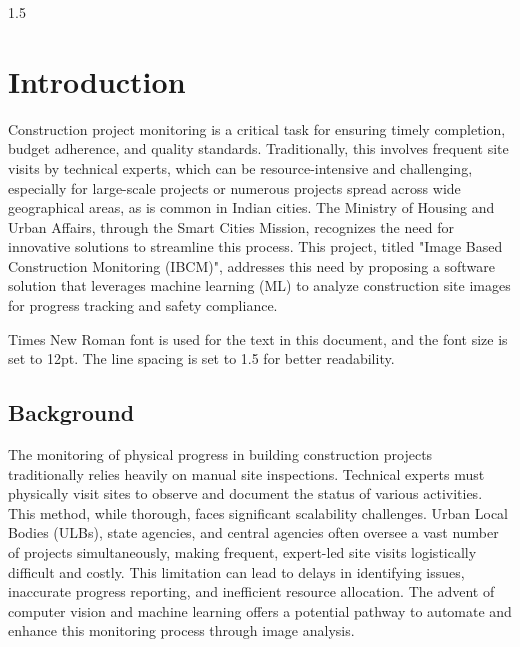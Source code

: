 \documentclass[12pt,a4paper]{report}
\begin{document}
\begin{spacing}{1.5}

    \chapter{Introduction}
    \label{chap:introduction}

    Construction project monitoring is a critical task for ensuring timely completion, budget adherence, and quality standards. Traditionally, this involves frequent site visits by technical experts, which can be resource-intensive and challenging, especially for large-scale projects or numerous projects spread across wide geographical areas, as is common in Indian cities. The Ministry of Housing and Urban Affairs, through the Smart Cities Mission, recognizes the need for innovative solutions to streamline this process. This project, titled "Image Based Construction Monitoring (IBCM)", addresses this need by proposing a software solution that leverages machine learning (ML) to analyze construction site images for progress tracking and safety compliance.

    Times New Roman font is used for the text in this document, and the font size is set to 12pt. The line spacing is set to 1.5 for better readability.

    \section{Background}
    The monitoring of physical progress in building construction projects traditionally relies heavily on manual site inspections. Technical experts must physically visit sites to observe and document the status of various activities. This method, while thorough, faces significant scalability challenges. Urban Local Bodies (ULBs), state agencies, and central agencies often oversee a vast number of projects simultaneously, making frequent, expert-led site visits logistically difficult and costly. This limitation can lead to delays in identifying issues, inaccurate progress reporting, and inefficient resource allocation. The advent of computer vision and machine learning offers a potential pathway to automate and enhance this monitoring process through image analysis.


\end{spacing}
\end{document}
